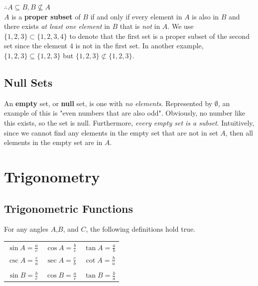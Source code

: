 \documentclass{article}
\begin{document}
            \noindent $\therefore A \subseteq B, B\not\subseteq A$ \\
            \noindent $A$ is a \textbf{proper subset} of $B$ if and only if every element in $A$ is
            also in $B$ and there exists \textit{at least one element} in $B$ that is \textit{not}
            in $A$. We use $\{1,2,3\}\subset\{1,2,3,4\}$ to denote that the first set is a proper
            subset of the second set since the element $4$ is not in the first set. In another
            example, $\{1,2,3\}\subseteq\{1,2,3\}$ but $\{1,2,3\}\not\subset\{1,2,3\}$.


        \subsection{Null Sets}
            An \textbf{empty} set, or \textbf{null} set, is one with \textit{no elements}.
            Represented by $\emptyset$, an example of this is "even numbers that are also odd".
            Obviously, no number like this exists, so the set is null. Furthermore,
            \textit{every empty set is a subset}. Intuitively, since we cannot find any elements
            in the empty set that are not in set $A$, then all elements in the empty set are in $A$.


    \pagebreak

    \section{Trigonometry}

        \subsection{Trigonometric Functions}
            For any angles $A$,$B$, and $C$, the following definitions hold true. \\

            \begin{center}
                \begin{tabular}{ccc}
                    $\sin A = \frac{a}{c}$
                    & $\cos A = \frac{b}{c}$
                    & $\tan A = \frac{a}{b}$ \\
                    $\csc A = \frac{c}{a}$
                    & $\sec A = \frac{c}{b}$
                    & $\cot A = \frac{b}{a}$\\\\
                    $\sin B = \frac{b}{c}$
                    & $\cos B = \frac{a}{c}$
                    & $\tan B = \frac{b}{a}$
                \end{tabular}
            \end{center}
\end{document}
